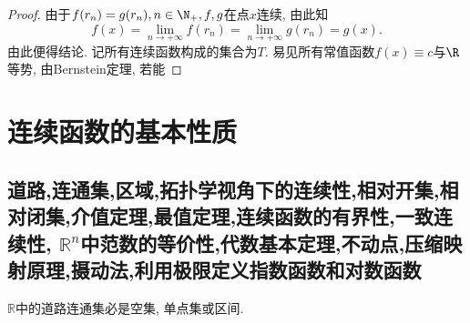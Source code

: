 \begin{2b}
\begin{enumerate}
\begin{proof}
由于\(f(r_n)=g(r_n),n\in\N_+,f,g\)在点\(x\)连续, 由此知
\[f(x)=\lim_{n\rightarrow+\infty}f(r_n)=\lim_{n\rightarrow+\infty}g(r_n)=g(x).\]
由此便得结论. 记所有连续函数构成的集合为\(T\). 易见所有常值函数\(f(x)\equiv c\)与\(\R\)等势, 由Bernstein定理, 若能

\end{proof}
\end{enumerate}
\end{2b}
\section{连续函数的基本性质}
\subsection{道路,连通集,区域,拓扑学视角下的连续性,相对开集,相对闭集,介值定理,最值定理,连续函数的有界性,一致连续性, \(\mathbb{R}^n\)中范数的等价性,代数基本定理,不动点,压缩映射原理,摄动法,利用极限定义指数函数和对数函数}
\begin{proposition}\label{C32}
    \(\mathbb{R}\)中的道路连通集必是空集, 单点集或区间.
\end{proposition}
